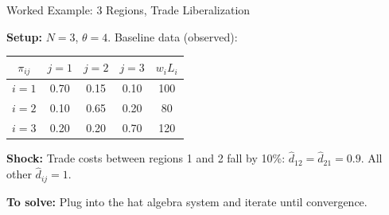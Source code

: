 \documentclass{beamer}
\begin{document}
\begin{frame}{Worked Example: 3 Regions, Trade Liberalization}

    \textbf{Setup:} $N=3$, $\theta = 4$. Baseline data (observed):

    \vspace{0.2em}
    {\small
    \begin{center}
    \begin{tabular}{ccccc}
        \toprule
        $\pi_{ij}$ & $j=1$ & $j=2$ & $j=3$ & $w_i L_i$ \\
        \midrule
        $i=1$ & 0.70 & 0.15 & 0.10 & 100 \\
        $i=2$ & 0.10 & 0.65 & 0.20 & 80 \\
        $i=3$ & 0.20 & 0.20 & 0.70 & 120 \\
        \bottomrule
    \end{tabular}
    \end{center}
    }

    \vspace{0.3em}
    \textbf{Shock:} Trade costs between regions 1 and 2 fall by 10\%: $\hat{d}_{12} = \hat{d}_{21} = 0.9$. All other $\hat{d}_{ij} = 1$.

    \vspace{0.3em}
    \textbf{To solve:} Plug into the hat algebra system and iterate until convergence.

    \vspace{0.3em}

\end{frame}
\end{document}
